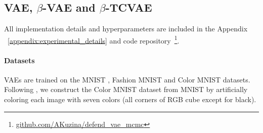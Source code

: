 
\subsection{VAE, $\beta$-VAE and $\beta$-TCVAE} %
All implementation details and hyperparameters are included in the Appendix ~\ref{appendix:experimental_details} and code repository~\footnote{\url{github.com/AKuzina/defend_vae_mcmc}}. 
\paragraph{Datasets}
VAEs are trained on the MNIST \citep{lecun1998mnist} , Fashion MNIST \cite{xiao2017fashion} and Color MNIST datasets. Following \citet{Cemgil2019-vn}, we construct the Color MNIST dataset from MNIST by artificially coloring each image with seven colors (all corners of RGB cube except for black). 

